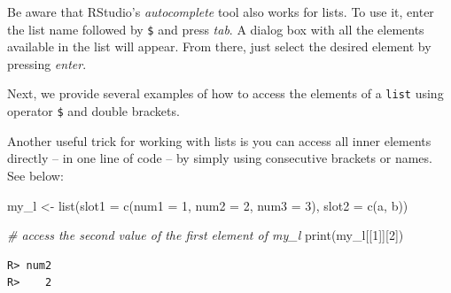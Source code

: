 \documentclass[
  12pt,
]{book}
\newenvironment{Shaded}{\begin{snugshade}}{\end{snugshade}}
\newcommand{\AttributeTok}[1]{\textcolor[rgb]{0.61,0.61,0.61}{#1}}
\newcommand{\CommentTok}[1]{\textcolor[rgb]{0.37,0.37,0.37}{\textit{#1}}}
\newcommand{\DecValTok}[1]{\textcolor[rgb]{0.06,0.06,0.06}{#1}}
\newcommand{\FunctionTok}[1]{\textcolor[rgb]{0,0,0}{#1}}
\newcommand{\NormalTok}[1]{#1}
\newcommand{\OtherTok}[1]{\textcolor[rgb]{0.37,0.37,0.37}{#1}}
\newcommand{\SpecialCharTok}[1]{\textcolor[rgb]{0,0,0}{#1}}
\newcommand{\StringTok}[1]{\textcolor[rgb]{0.5,0.5,0.5}{#1}}
\newenvironment{rmdimportant}
{\begin{importantblock}
		
	} {\end{importantblock}}
\begin{document}
\begin{rmdimportant}
Be aware that RStudio's \emph{autocomplete} tool also works for lists.
To use it, enter the list name followed by \texttt{\$} and press
\emph{tab}. A dialog box with all the elements available in the list
will appear. From there, just select the desired element by pressing
\emph{enter}.
\end{rmdimportant}

Next, we provide several examples of how to access the elements of a \texttt{list} using operator \texttt{\$} and double brackets.

\begin{Shaded}
\end{Shaded}

Another useful trick for working with lists is you can access all inner elements directly -- in one line of code -- by simply using consecutive brackets or names. See below:

\begin{Shaded}
\begin{Highlighting}[]
\NormalTok{my\_l }\OtherTok{\textless{}{-}} \FunctionTok{list}\NormalTok{(}\AttributeTok{slot1 =} \FunctionTok{c}\NormalTok{(}\AttributeTok{num1 =} \DecValTok{1}\NormalTok{, }
                       \AttributeTok{num2 =} \DecValTok{2}\NormalTok{, }
                       \AttributeTok{num3 =} \DecValTok{3}\NormalTok{), }
             \AttributeTok{slot2 =} \FunctionTok{c}\NormalTok{(}\StringTok{\textquotesingle{}a\textquotesingle{}}\NormalTok{, }\StringTok{\textquotesingle{}b\textquotesingle{}}\NormalTok{))}

\CommentTok{\# access the second value of the first element of my\_l}
\FunctionTok{print}\NormalTok{(my\_l[[}\DecValTok{1}\NormalTok{]][}\DecValTok{2}\NormalTok{])}
\end{Highlighting}
\end{Shaded}

\begin{verbatim}
R> num2 
R>    2
\end{verbatim}
\end{document}
